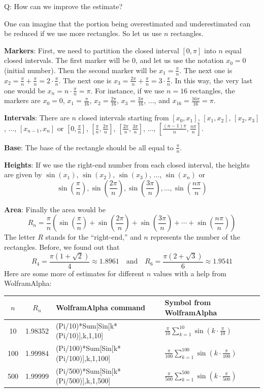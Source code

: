 \documentclass[12pt]{article}
\begin{document}
Q: How can we improve the estimate?

One can imagine that the portion being overestimated and underestimated can be reduced if we use more rectangles. So let us use $n$ rectangles.

\textbf{Markers}: First, we need to partition the closed interval $[0, \pi]$ into $n$ equal closed intervals. The first marker will be $0$, and let us use the notation $x_0 = 0$ (initial number). Then the second marker will be $x_1 = \frac{\pi}{n}$. The next one is $x_2 = \frac{\pi}{n} + \frac{\pi}{n} = 2 \cdot \frac{\pi}{n}$. The next one is $x_3 = \frac{2\pi}{n} + \frac{\pi}{n} = 3 \cdot \frac{\pi}{n}$. In this way, the very last one would be $x_n = n \cdot \frac{\pi}{n} = \pi$. For instance, if we use $n = 16$ rectangles, the markers are $x_0 = 0$, $x_1 = \frac{\pi}{16}$, $x_2 = \frac{2\pi}{16}$, $x_3 = \frac{3\pi}{16}$, $\ldots$, and $x_{16} = \frac{16\pi}{16} = \pi$.

\textbf{Intervals}: There are $n$ closed intervals starting from $[x_0,x_1]$, $[x_1, x_2]$, $[x_2,x_3]$, $\ldots$, $[x_{n-1}, x_n]$ or
$[0, \frac{\pi}{n}]$, $[\frac{\pi}{n}, \frac{2\pi}{n}]$, $[\frac{2\pi}{n}, \frac{3\pi}{n}]$, $\ldots$, $[\frac{(n-1)\pi}{n}, \frac{n\pi}{n}]$.

\textbf{Base}: The base of the rectangle should be all equal to $\frac{\pi}{n}$.

\textbf{Heights}: If we use the right-end number from each closed interval, the heights are given by $\sin(x_1)$, $\sin(x_2)$, $\sin(x_3)$, $\ldots$, $\sin(x_n) $ or
$$ \sin\left(\frac{\pi}{n}\right), \sin\left(\frac{2\pi}{n}\right), \sin\left(\frac{3\pi}{n}\right), \ldots, \sin\left(\frac{n\pi}{n}\right) $$

\textbf{Area}: Finally the area would be
$$ R_n = \frac{\pi}{n}\left(\sin\left(\frac{\pi}{n}\right) + \sin\left(\frac{2\pi}{n}\right) + \sin\left(\frac{3\pi}{n}\right) + \cdots + \sin\left(\frac{n\pi}{n}\right)\right) $$
The letter $R$ stands for the ``right-end,'' and $n$ represents the number of the rectangles. Before, we found out that
$$ R_4 = \frac{\pi(1 + \sqrt{2})}{4} \approx 1.8961 \quad \text{and} \quad R_6 = \frac{\pi(2 + \sqrt{3})}{6} \approx 1.9541 $$
Here are some more of estimates for different $n$ values with a help from WolframAlpha:

\begin{tabular}{|c|c|l|l|}
\hline
$n$ & $R_n$ & WolframAlpha command & Symbol from WolframAlpha \\
\hline
10 & 1.98352 & (Pi/10)*Sum[Sin[k*(Pi/10)],{k,1,10}] & $\frac{\pi}{10}\sum_{k=1}^{10} \sin(k \cdot \frac{\pi}{10})$ \\
100 & 1.99984 & (Pi/100)*Sum[Sin[k*(Pi/100)],{k,1,100}] & $\frac{\pi}{100}\sum_{k=1}^{100} \sin(k \cdot \frac{\pi}{100})$ \\
500 & 1.99999 & (Pi/500)*Sum[Sin[k*(Pi/500)],{k,1,500}] & $\frac{\pi}{500}\sum_{k=1}^{500} \sin(k \cdot \frac{\pi}{500})$ \\
\hline
\end{tabular}
\end{document}
